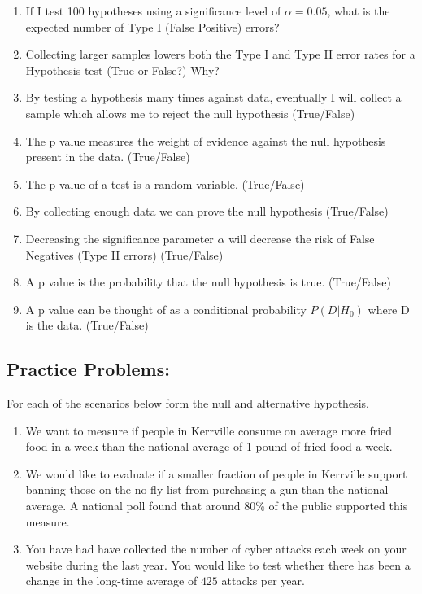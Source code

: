 \documentclass[
]{book}
\providecommand{\tightlist}{%
  \setlength{\itemsep}{0pt}\setlength{\parskip}{0pt}}
\theoremstyle{definition}
\theoremstyle{definition}
\theoremstyle{definition}
\theoremstyle{definition}
\theoremstyle{remark}
\begin{document}
\begin{enumerate}
\def\labelenumi{\arabic{enumi}.}
\tightlist
\item
  If I test 100 hypotheses using a significance level of \(\alpha=0.05\), what is the expected number of Type I (False Positive) errors?
\item
  Collecting larger samples lowers both the Type I and Type II error rates for a Hypothesis test (True or False?) Why?
\item
  By testing a hypothesis many times against data, eventually I will collect a sample which allows me to reject the null hypothesis (True/False)
\item
  The p value measures the weight of evidence against the null hypothesis present in the data. (True/False)
\item
  The p value of a test is a random variable. (True/False)
\item
  By collecting enough data we can prove the null hypothesis (True/False)
\item
  Decreasing the significance parameter \(\alpha\) will decrease the risk of False Negatives (Type II errors) (True/False)
\item
  A p value is the probability that the null hypothesis is true. (True/False)
\item
  A p value can be thought of as a conditional probability \(P(D|H_0)\) where D is the data. (True/False)
\end{enumerate}

\hypertarget{practice-problems-12}{%
\subsection{Practice Problems:}\label{practice-problems-12}}

For each of the scenarios below form the null and alternative hypothesis.

\begin{enumerate}
\def\labelenumi{\arabic{enumi}.}
\tightlist
\item
  We want to measure if people in Kerrville consume on average more fried food in a week than the national average of 1 pound of fried food a week.
\item
  We would like to evaluate if a smaller fraction of people in Kerrville support banning those on the no-fly list from purchasing a gun than the national average. A national poll found that around 80\% of the public supported this measure.
\item
  You have had have collected the number of cyber attacks each week on your website during the last year. You would like to test whether there has been a change in the long-time average of \(425\) attacks per year.
\end{enumerate}
\end{document}
